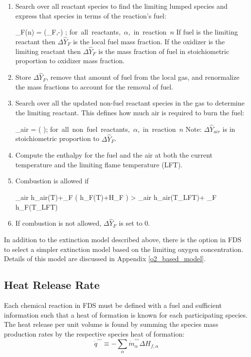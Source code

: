 \begin{enumerate}
\item Search over all reactant species to find the limiting lumped species and express that species in terms of the reaction's fuel:

\be {}_{F}(n) = \min \left (_F,-\right) \quad ; \quad \mbox{for all reactants, $\alpha$, in reaction $n$} \ee
If fuel is the limiting reactant then $\Delta \hat{Y}_{F}$ is the local fuel mass fraction. If the oxidizer is the limiting reactant then $\Delta \hat{Y}_{F}$ is the mass fraction of fuel in stoichiometric proportion to oxidizer mass fraction.
\item Store $\Delta \hat{Y}_{F}$, remove that amount of fuel from the local gas, and renormalize the mass fractions to account for the removal of fuel.
\item Search over all the updated non-fuel reactant species in the gas to determine the limiting reactant.  This defines how much air is required to burn the fuel:

\be \Delta {}_{air} = \min \left( \right); \quad \mbox{for all non fuel reactants, $\alpha$, in reaction $n$} \ee
Note: $\Delta \hat{Y}_{air}$ is in stoichiometric proportion to $\Delta \hat{Y}_{F}$.
\item Compute the enthalpy for the fuel and the air at both the current temperature and the limiting flame temperature (LFT).
\item Combustion is allowed if 

\be \Delta {}_{air} h_{air}(T)+\Delta {}_{F} \left( h_F(T)+\Delta H_F \right) > \Delta {}_{air} h_{air}(T_{LFT})+ \Delta {}_{F} h_F(T_{LFT}) \ee
\item If combustion is not allowed, $\Delta \hat{Y}_{F}$ is set to 0.
\end{enumerate}

In addition to the extinction model described above, there is the option in FDS to select a simpler extinction model based on the limiting oxygen concentration. Details of this model are discussed in Appendix \ref{o2_based_model}.

\subsection{Heat Release Rate}

Each chemical reaction in FDS must be defined with a fuel and sufficient information such that a heat of formation is known for each participating species. The heat release per unit volume is found by summing the species mass production rates by the respective species heat of formation:
\begin{equation}\label{eq:vol_heat_gen}
\dot{q}^{\prime\prime\prime} \equiv -\displaystyle \sum_{\alpha} \dot{m}^{\prime\prime\prime}_{\alpha} \Delta H_{f,\alpha}
\end{equation}

